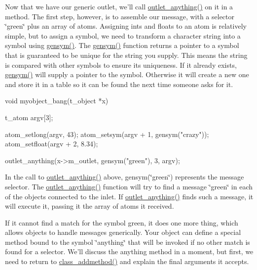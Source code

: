 Now that we have our generic outlet, we'll call \hyperlink{group__inout_ga12798ee897e01dac21ee547c4091d8a8}{outlet\_\-anything()} on it in a method. The first step, however, is to assemble our message, with a selector \char`\"{}green\char`\"{} plus an array of atoms. Assigning ints and floats to an atom is relatively simple, but to assign a symbol, we need to transform a character string into a symbol using \hyperlink{group__symbol_ga8268797d125a15bae1010af70b559e05}{gensym()}. The \hyperlink{group__symbol_ga8268797d125a15bae1010af70b559e05}{gensym()} function returns a pointer to a symbol that is guaranteed to be unique for the string you supply. This means the string is compared with other symbols to ensure its uniqueness. If it already exists, \hyperlink{group__symbol_ga8268797d125a15bae1010af70b559e05}{gensym()} will supply a pointer to the symbol. Otherwise it will create a new one and store it in a table so it can be found the next time someone asks for it.


\begin{DoxyCode}
    void myobject_bang(t_object *x)
    {
        t_atom argv[3];

        atom_setlong(argv, 43);
        atom_setsym(argv + 1, gensym("crazy"));
        atom_setfloat(argv + 2, 8.34);

        outlet_anything(x->m_outlet, gensym("green"), 3, argv);
    }
\end{DoxyCode}


In the call to \hyperlink{group__inout_ga12798ee897e01dac21ee547c4091d8a8}{outlet\_\-anything()} above, gensym(\char`\"{}green\char`\"{}) represents the message selector. The \hyperlink{group__inout_ga12798ee897e01dac21ee547c4091d8a8}{outlet\_\-anything()} function will try to find a message \char`\"{}green\char`\"{} in each of the objects connected to the inlet. If \hyperlink{group__inout_ga12798ee897e01dac21ee547c4091d8a8}{outlet\_\-anything()} finds such a message, it will execute it, passing it the array of atoms it received.

If it cannot find a match for the symbol green, it does one more thing, which allows objects to handle messages generically. Your object can define a special method bound to the symbol \char`\"{}anything\char`\"{} that will be invoked if no other match is found for a selector. We'll discuss the anything method in a moment, but first, we need to return to \hyperlink{group__class_ga1fabf54e0cec8d4e5f732fa347b3f874}{class\_\-addmethod()} and explain the final arguments it accepts.

